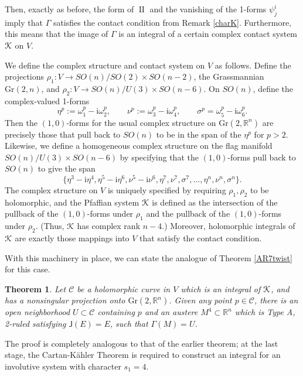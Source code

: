 \documentclass[12pt,reqno]{amsart}
\newtheorem{theorem}{Theorem}
\theoremstyle{definition}
\theoremstyle{remark}
\begin{document}
Then, exactly as before, the form of ${\operatorname{II}}$ and
the vanishing of the 1-forms $\psi^i_j$ imply that $\Gamma$ satisfies the contact condition
from Remark \ref{charK}.  Furthermore, this means that the image of $\Gamma$ is an integral of a certain complex contact system ${{\EuScript K}}$ on $V$.

We define the complex structure and contact system on $V$ as follows.  Define the projections
$\rho_1: V \to SO(n)/SO(2)\times SO(n-2)$, the Grassmannian ${{\mathrm{Gr}}}(2,n)$, and
$\rho_2: V \to SO(n)/U(3) \times SO(n-6)$.  On $SO(n)$, define the complex-valued 1-forms
$$\eta^p := {\omega}^p_1 - {\mathrm i} {\omega}^p_2, \qquad \nu^p:= {\omega}^p_3 - {\mathrm i} {\omega}^p_4, \qquad \sigma^p = {\omega}^p_5-{\mathrm i} {\omega}^p_6.$$
Then the $(1,0)$-forms for the usual complex structure on ${{\mathrm{Gr}}}(2,{\mathbb R}^n)$ are
precisely those that pull back to $SO(n)$ to be in the span of the $\eta^p$ for $p>2$.
Likewise, we define a homogeneous complex structure on the flag manifold $SO(n)/U(3) \times SO(n-6)$
by specifying that the $(1,0)$-forms pull back to $SO(n)$ to give the span
$$\{ \eta^3-{\mathrm i} \eta^4, \eta^5-{\mathrm i} \eta^6, \nu^5-{\mathrm i} \nu^6,
 \eta^7, \nu^7, \sigma^7, \ldots, \eta^n, \nu^n, \sigma^n \}.$$
The complex structure on $V$ is uniquely specified by requiring $\rho_1, \rho_2$ to be holomorphic,
and the Pfaffian system ${{\EuScript K}}$ is defined as the intersection of the pullback of the $(1,0)$-forms under
$\rho_1$ and the pullback of the $(1,0)$-forms under $\rho_2$.
(Thus, ${{\EuScript K}}$ has complex rank $n-4$.)
Moreover, holomorphic integrals of ${{\EuScript K}}$ are exactly those mappings into $V$ that satisfy the contact condition.

With this machinery in place, we can state the analogue of Theorem \ref{AR7twist} for this case.

\begin{theorem}\label{AR8twist}
Let ${\mathscr C}$ be a holomorphic curve in $V$ which is an integral of ${{\EuScript K}}$,
and has a nonsingular projection onto ${{\mathrm{Gr}}}(2,{\mathbb R}^n)$.  Given
any point $p\in {\mathscr C}$, there is an open neighborhood $U\subset {\mathscr C}$ containing $p$
and an austere  $M^4\subset {\mathbb R}^n$ which is Type A, 2-ruled satisfying ${\mathsf J}(E)=E$, such
that $\Gamma(M) = U$.
\end{theorem}

The proof is completely analogous to that of the earlier theorem; at the last stage, the Cartan-K\"ahler
Theorem is required to construct an integral for an involutive system with character $s_1=4$.
\end{document}
